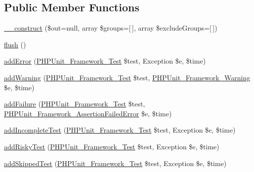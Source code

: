 \subsection*{Public Member Functions}
\begin{DoxyCompactItemize}
\item 
\mbox{\hyperlink{class_p_h_p_unit___util___test_dox___result_printer_afc57c5b9c0b164fa351aaf182925862b}{\+\_\+\+\_\+construct}} (\$out=null, array \$groups=\mbox{[}$\,$\mbox{]}, array \$exclude\+Groups=\mbox{[}$\,$\mbox{]})
\item 
\mbox{\hyperlink{class_p_h_p_unit___util___test_dox___result_printer_a7751f77b5263bcf940ece6e824a05b38}{flush}} ()
\item 
\mbox{\hyperlink{class_p_h_p_unit___util___test_dox___result_printer_a320d7bc7d2f9264ee7ba7aca6fd2df41}{add\+Error}} (\mbox{\hyperlink{interface_p_h_p_unit___framework___test}{P\+H\+P\+Unit\+\_\+\+Framework\+\_\+\+Test}} \$test, Exception \$e, \$time)
\item 
\mbox{\hyperlink{class_p_h_p_unit___util___test_dox___result_printer_a6c3d134992c5b03573561ef82e7f743d}{add\+Warning}} (\mbox{\hyperlink{interface_p_h_p_unit___framework___test}{P\+H\+P\+Unit\+\_\+\+Framework\+\_\+\+Test}} \$test, \mbox{\hyperlink{class_p_h_p_unit___framework___warning}{P\+H\+P\+Unit\+\_\+\+Framework\+\_\+\+Warning}} \$e, \$time)
\item 
\mbox{\hyperlink{class_p_h_p_unit___util___test_dox___result_printer_a668f17b68705c5c8686bac690a6f719d}{add\+Failure}} (\mbox{\hyperlink{interface_p_h_p_unit___framework___test}{P\+H\+P\+Unit\+\_\+\+Framework\+\_\+\+Test}} \$test, \mbox{\hyperlink{class_p_h_p_unit___framework___assertion_failed_error}{P\+H\+P\+Unit\+\_\+\+Framework\+\_\+\+Assertion\+Failed\+Error}} \$e, \$time)
\item 
\mbox{\hyperlink{class_p_h_p_unit___util___test_dox___result_printer_a81bfe09a62194fe5769ca1cc36ee428b}{add\+Incomplete\+Test}} (\mbox{\hyperlink{interface_p_h_p_unit___framework___test}{P\+H\+P\+Unit\+\_\+\+Framework\+\_\+\+Test}} \$test, Exception \$e, \$time)
\item 
\mbox{\hyperlink{class_p_h_p_unit___util___test_dox___result_printer_ad161e7d13b117cb0af3967cd2adc6bba}{add\+Risky\+Test}} (\mbox{\hyperlink{interface_p_h_p_unit___framework___test}{P\+H\+P\+Unit\+\_\+\+Framework\+\_\+\+Test}} \$test, Exception \$e, \$time)
\item 
\mbox{\hyperlink{class_p_h_p_unit___util___test_dox___result_printer_a1c0cb3bc58e5807530daf3a93783ed4e}{add\+Skipped\+Test}} (\mbox{\hyperlink{interface_p_h_p_unit___framework___test}{P\+H\+P\+Unit\+\_\+\+Framework\+\_\+\+Test}} \$test, Exception \$e, \$time)

\end{DoxyCompactItemize}
